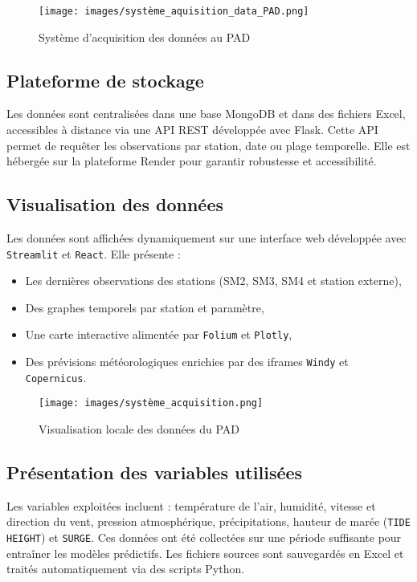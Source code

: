 \documentclass[a4paper,12pt,openany]{report}
\begin{document}
\begin{figure}[H]
	\centering
	\texttt{[image: images/système\_aquisition\_data\_PAD.png]}
	\caption{Système d'acquisition des données au PAD \label{Fig 2.4}}
\end{figure}

\subsection{Plateforme de stockage}

\quad Les données sont centralisées dans une base MongoDB et dans des fichiers Excel, accessibles à distance via une API REST développée avec Flask. Cette API permet de requêter les observations par station, date ou plage temporelle. Elle est hébergée sur la plateforme Render pour garantir robustesse et accessibilité.

\subsection{Visualisation des données}

\quad Les données sont affichées dynamiquement sur une interface web développée avec \texttt{Streamlit} et \texttt{React}. Elle présente :
\begin{itemize}
	\item Les dernières observations des stations (SM2, SM3, SM4 et station externe),
	\item Des graphes temporels par station et paramètre,
	\item Une carte interactive alimentée par \texttt{Folium} et \texttt{Plotly},
	\item Des prévisions météorologiques enrichies par des iframes \texttt{Windy} et \texttt{Copernicus}.
\end{itemize}

\begin{figure}[H]
	\centering
	\texttt{[image: images/système\_acquisition.png]}
	\caption{Visualisation locale des données du PAD \label{Fig 2.5}}
\end{figure}

\subsection{Présentation des variables utilisées}

\quad Les variables exploitées incluent : température de l’air, humidité, vitesse et direction du vent, pression atmosphérique, précipitations, hauteur de marée (\texttt{TIDE HEIGHT}) et \texttt{SURGE}. Ces données ont été collectées sur une période suffisante pour entraîner les modèles prédictifs. Les fichiers sources sont sauvegardés en Excel et traités automatiquement via des scripts Python.
\end{document}
